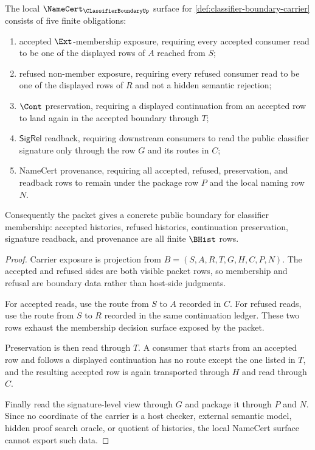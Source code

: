 \begin{theorem}
\label{thm:classifier-boundary-namecert-obligations}
The local $\NameCert_{\ClassifierBoundaryUp}$ surface for \autoref{def:classifier-boundary-carrier} consists of five finite obligations:
\begin{enumerate}
\item accepted $\Ext$-membership exposure, requiring every accepted consumer read to be one of the displayed rows of $A$ reached from $S$;
\item refused non-member exposure, requiring every refused consumer read to be one of the displayed rows of $R$ and not a hidden semantic rejection;
\item $\Cont$ preservation, requiring a displayed continuation from an accepted row to land again in the accepted boundary through $T$;
\item $\mathsf{SigRel}$ readback, requiring downstream consumers to read the public classifier signature only through the row $G$ and its routes in $C$;
\item NameCert provenance, requiring all accepted, refused, preservation, and readback rows to remain under the package row $P$ and the local naming row $N$.
\end{enumerate}
Consequently the packet gives a concrete public boundary for classifier membership: accepted histories, refused histories, continuation preservation, signature readback, and provenance are all finite $\BHist$ rows.
\end{theorem}
\begin{proof}
Carrier exposure is projection from $B=(S,A,R,T,G,H,C,P,N)$. The accepted and refused sides are both visible packet rows, so membership and refusal are boundary data rather than host-side judgments.

For accepted reads, use the route from $S$ to $A$ recorded in $C$. For refused reads, use the route from $S$ to $R$ recorded in the same continuation ledger. These two rows exhaust the membership decision surface exposed by the packet.

Preservation is then read through $T$. A consumer that starts from an accepted row and follows a displayed continuation has no route except the one listed in $T$, and the resulting accepted row is again transported through $H$ and read through $C$.

Finally read the signature-level view through $G$ and package it through $P$ and $N$. Since no coordinate of the carrier is a host checker, external semantic model, hidden proof search oracle, or quotient of histories, the local NameCert surface cannot export such data.
\end{proof}

